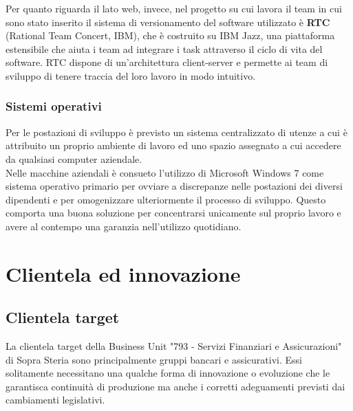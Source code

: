 	Per quanto riguarda il lato web, invece, nel progetto su cui lavora il team in cui sono stato inserito il sistema di versionamento del software utilizzato è \textbf{RTC} (Rational Team Concert, IBM), che è costruito su IBM Jazz, una piattaforma estensibile che aiuta i team ad integrare i task attraverso il ciclo di vita del software. RTC dispone di un'architettura client-server e permette ai team di sviluppo di tenere traccia del loro lavoro in modo intuitivo.
	
	\subsubsection{Sistemi operativi}
	
	Per le postazioni di sviluppo è previsto un sistema centralizzato di utenze a cui è attribuito un proprio ambiente di lavoro ed uno spazio assegnato a cui accedere da qualsiasi computer aziendale.\\
	
	Nelle macchine aziendali è consueto l'utilizzo di Microsoft Windows 7 come sistema operativo primario per ovviare a discrepanze nelle postazioni dei diversi dipendenti e per omogenizzare ulteriormente il processo di sviluppo. Questo comporta una buona soluzione per concentrarsi unicamente sul proprio lavoro e avere al contempo una garanzia nell'utilizzo quotidiano.
	

\section{Clientela ed innovazione}

	\subsection{Clientela target}
	
	La clientela target della Business Unit "793 - Servizi Finanziari e Assicurazioni" di Sopra Steria sono principalmente gruppi bancari e assicurativi. Essi solitamente necessitano una qualche forma di innovazione o evoluzione che le garantisca continuità di produzione ma anche i corretti adeguamenti previsti dai cambiamenti legislativi.\\
	
